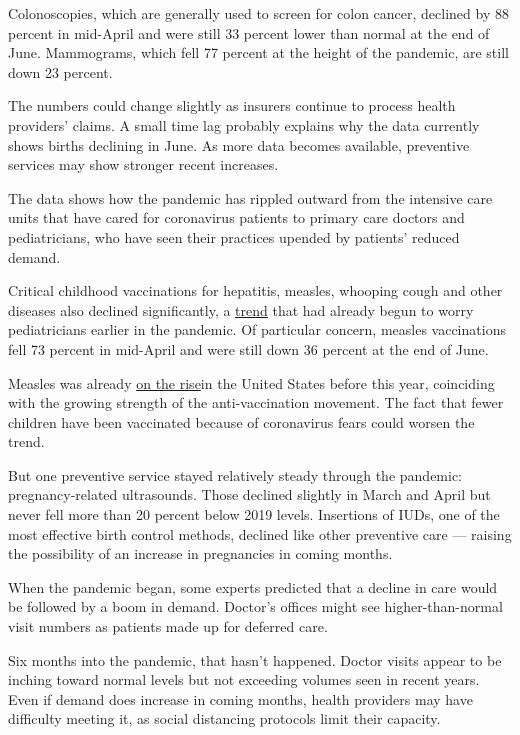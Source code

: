 Colonoscopies, which are generally used to screen for colon cancer,
declined by 88 percent in mid-April and were still 33 percent lower than
normal at the end of June. Mammograms, which fell 77 percent at the
height of the pandemic, are still down 23 percent.

The numbers could change slightly as insurers continue to process health
providers' claims. A small time lag probably explains why the data
currently shows births declining in June. As more data becomes
available, preventive services may show stronger recent increases.

The data shows how the pandemic has rippled outward from the intensive
care units that have cared for coronavirus patients to primary care
doctors and pediatricians, who have seen their practices upended by
patients' reduced demand.

Critical childhood vaccinations for hepatitis, measles, whooping cough
and other diseases also declined significantly, a
\href{https://www.nytimes3xbfgragh.onion/2020/04/23/health/coronavirus-measles-vaccines.html}{trend}
that had already begun to worry pediatricians earlier in the pandemic.
Of particular concern, measles vaccinations fell 73 percent in mid-April
and were still down 36 percent at the end of June.

Measles was already
\href{https://www.nejm.org/doi/full/10.1056/NEJMp1905099}{on the rise}in
the United States before this year, coinciding with the growing strength
of the anti-vaccination movement. The fact that fewer children have been
vaccinated because of coronavirus fears could worsen the trend.

But one preventive service stayed relatively steady through the
pandemic: pregnancy-related ultrasounds. Those declined slightly in
March and April but never fell more than 20 percent below 2019 levels.
Insertions of IUDs, one of the most effective birth control methods,
declined like other preventive care --- raising the possibility of an
increase in pregnancies in coming months.

When the pandemic began, some experts predicted that a decline in care
would be followed by a boom in demand. Doctor's offices might see
higher-than-normal visit numbers as patients made up for deferred care.

Six months into the pandemic, that hasn't happened. Doctor visits appear
to be inching toward normal levels but not exceeding volumes seen in
recent years. Even if demand does increase in coming months, health
providers may have difficulty meeting it, as social distancing protocols
limit their capacity.

